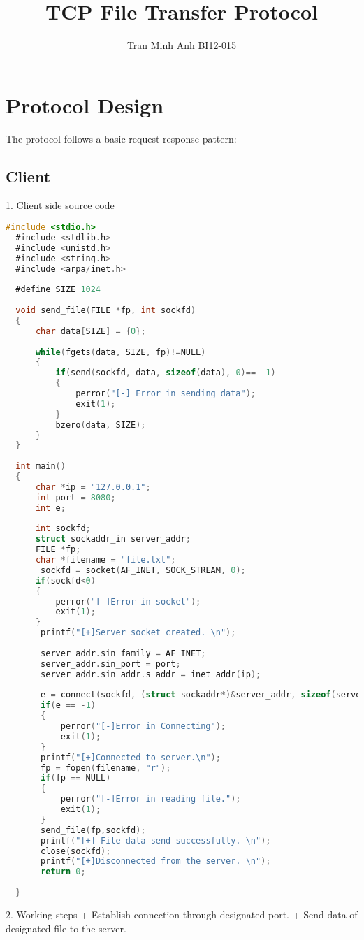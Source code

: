 \documentclass{article}
\begin{document}
\title{TCP File Transfer Protocol}
\author{Tran Minh Anh BI12-015}

\maketitle

\section{Protocol Design}

The protocol follows a basic request-response pattern:

\subsection{Client}

1. Client side source code\newline

\begin{lstlisting}[language=C, caption=Client Code, label=lst:code]
  #include <stdio.h>
  #include <stdlib.h>
  #include <unistd.h>
  #include <string.h>
  #include <arpa/inet.h>
  
  #define SIZE 1024
  
  void send_file(FILE *fp, int sockfd)
  {
      char data[SIZE] = {0};
  
      while(fgets(data, SIZE, fp)!=NULL)
      {
          if(send(sockfd, data, sizeof(data), 0)== -1)
          {
              perror("[-] Error in sending data");
              exit(1);
          }
          bzero(data, SIZE);
      }
  }
  
  int main()
  {
      char *ip = "127.0.0.1";
      int port = 8080;
      int e;
  
      int sockfd;
      struct sockaddr_in server_addr;
      FILE *fp;
      char *filename = "file.txt";
       sockfd = socket(AF_INET, SOCK_STREAM, 0);
      if(sockfd<0)
      {
          perror("[-]Error in socket");
          exit(1);
      }
       printf("[+]Server socket created. \n");
  
       server_addr.sin_family = AF_INET;
       server_addr.sin_port = port;
       server_addr.sin_addr.s_addr = inet_addr(ip);
  
       e = connect(sockfd, (struct sockaddr*)&server_addr, sizeof(server_addr));
       if(e == -1)
       {
           perror("[-]Error in Connecting");
           exit(1);
       }
       printf("[+]Connected to server.\n");
       fp = fopen(filename, "r");
       if(fp == NULL)
       {
           perror("[-]Error in reading file.");
           exit(1);
       }
       send_file(fp,sockfd);
       printf("[+] File data send successfully. \n");
       close(sockfd);
       printf("[+]Disconnected from the server. \n");
       return 0;
  
  }
\end{lstlisting}
2. Working steps\newline
+ Establish connection through designated port.\newline
+ Send data of designated file to the server.\newline 
\end{document}
